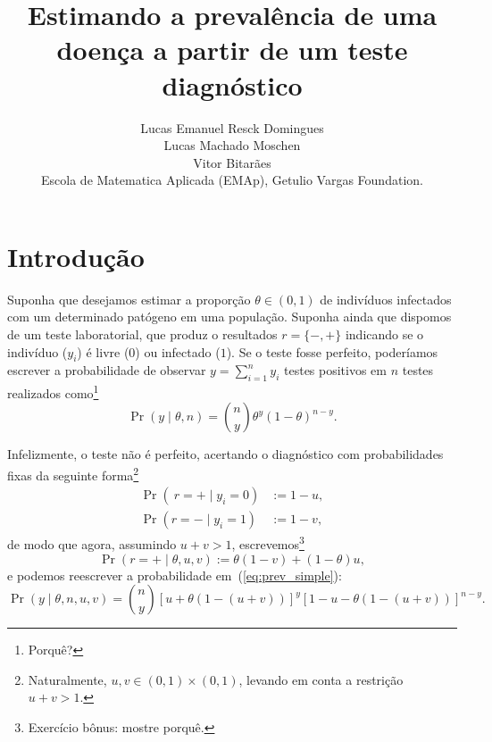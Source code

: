 \documentclass[a4paper, notitlepage, 10pt]{article}
\title{\vspace{-9ex}\centering \bf Estimando a prevalência de uma doença a partir de um teste diagnóstico}
\author{
Lucas Emanuel Resck Domingues \\
Lucas Machado Moschen \\
Vitor Bitarães \\
Escola de Matematica Aplicada (EMAp), Getulio Vargas Foundation.
}
\begin{document}
\maketitle

% 


\section*{Introdução}

Suponha que desejamos estimar a proporção $\theta \in (0, 1)$ de indivíduos infectados com um determinado patógeno em uma população.
Suponha ainda que dispomos de um teste laboratorial, que produz o resultados $r = \{-, +\}$ indicando se o indivíduo ($y_i$) é livre ($0$) ou infectado ($1$).
Se o teste fosse perfeito, poderíamos escrever a probabilidade de observar $y = \sum_{i =1}^n y_i$ testes positivos em $n$ testes realizados como\footnote{Porquê?}
\begin{equation}
\label{eq:prev_simple}
 \operatorname{Pr}\left( y \mid \theta, n \right) = \binom{n}{y} \theta^y (1-\theta)^{n-y}. 
\end{equation}

Infelizmente, o teste não é perfeito, acertando o diagnóstico com probabilidades fixas da seguinte forma\footnote{Naturalmente, $u, v \in (0, 1) \times (0, 1)$, levando em conta a restrição $u + v > 1$.}
\begin{align}
 \operatorname{Pr}\left(\ r = + \mid y_i = 0 \right) &:= 1-u,\\
 \operatorname{Pr}\left( r = - \mid y_i = 1 \right) &:= 1-v,
\end{align}
de modo que agora, assumindo $u + v > 1$, escrevemos\footnote{Exercício bônus: mostre porquê.}
\begin{equation}
  \operatorname{Pr}\left(r = + \mid \theta, u, v \right) := \theta ( 1- v) + (1-\theta)u,
\end{equation}
e podemos reescrever a probabilidade em~(\ref{eq:prev_simple}):
\begin{equation}
 \operatorname{Pr}\left(y \mid \theta, n, u, v\right) = \binom{n}{y} \left[ u + \theta ( 1- (u  + v)) \right]^{y} \left[ 1 -u - \theta (1 -(u + v))\right]^{n-y}.
\end{equation}
\end{document}
